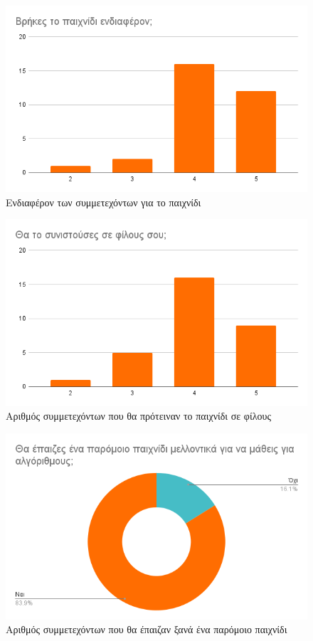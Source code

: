 \begin{figure}[H]
    \centering
    \includegraphics[width=0.7\linewidth]{sections/5/2/images/did_you_find_the_game_interesting}
    \caption{Ενδιαφέρον των συμμετεχόντων για το παιχνίδι}
    \label{fig:did_you_find_the_game_interesting}
\end{figure}

\begin{figure}[H]
    \centering
    \includegraphics[width=0.7\linewidth]{sections/5/2/images/would_you_reccomend_it_to_your_friends}
    \caption{Αριθμός συμμετεχόντων που θα πρότειναν το παιχνίδι σε φίλους}
    \label{fig:would_you_reccomend_it_to_your_friends}
\end{figure}

\begin{figure}[H]
    \centering
    \includegraphics[width=0.7\linewidth]{sections/5/2/images/would_you_play_a_similar_game_in_the_future}
    \caption{Αριθμός συμμετεχόντων που θα έπαιζαν ξανά ένα παρόμοιο παιχνίδι}
    \label{fig:would_you_play_a_similar_game_in_the_future}
\end{figure}

